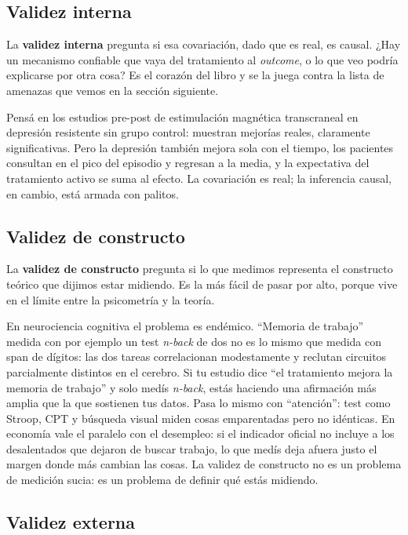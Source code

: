\documentclass[
  letterpaper,
  DIV=11,
  numbers=noendperiod,
  oneside]{scrreprt}
\begin{document}
\hypertarget{validez-interna}{%
\subsection{Validez interna}\label{validez-interna}}

La \textbf{validez interna} pregunta si esa covariación, dado que es
real, es causal. ¿Hay un mecanismo confiable que vaya del tratamiento al
\emph{outcome}, o lo que veo podría explicarse por otra cosa? Es el
corazón del libro y se la juega contra la lista de amenazas que vemos en
la sección siguiente.

Pensá en los estudios pre-post de estimulación magnética transcraneal en
depresión resistente sin grupo control: muestran mejorías reales,
claramente significativas. Pero la depresión también mejora sola con el
tiempo, los pacientes consultan en el pico del episodio y regresan a la
media, y la expectativa del tratamiento activo se suma al efecto. La
covariación es real; la inferencia causal, en cambio, está armada con
palitos.

\hypertarget{validez-de-constructo}{%
\subsection{Validez de constructo}\label{validez-de-constructo}}

La \textbf{validez de constructo} pregunta si lo que medimos representa
el constructo teórico que dijimos estar midiendo. Es la más fácil de
pasar por alto, porque vive en el límite entre la psicometría y la
teoría.

En neurociencia cognitiva el problema es endémico. ``Memoria de
trabajo'' medida con por ejemplo un test \emph{n-back} de dos no es lo
mismo que medida con span de dígitos: las dos tareas correlacionan
modestamente y reclutan circuitos parcialmente distintos en el cerebro.
Si tu estudio dice ``el tratamiento mejora la memoria de trabajo'' y
solo medís \emph{n-back}, estás haciendo una afirmación más amplia que
la que sostienen tus datos. Pasa lo mismo con ``atención'': test como
Stroop, CPT y búsqueda visual miden cosas emparentadas pero no
idénticas. En economía vale el paralelo con el desempleo: si el
indicador oficial no incluye a los desalentados que dejaron de buscar
trabajo, lo que medís deja afuera justo el margen donde más cambian las
cosas. La validez de constructo no es un problema de medición sucia: es
un problema de definir qué estás midiendo.

\hypertarget{validez-externa}{%
\subsection{Validez externa}\label{validez-externa}}
\end{document}
